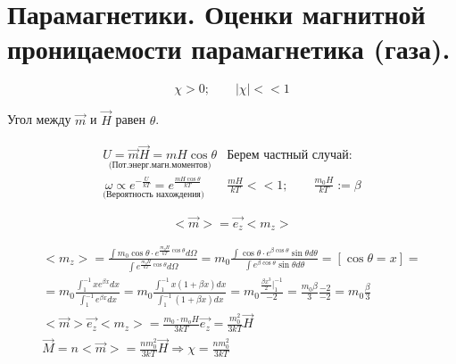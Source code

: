 \section{Парамагнетики. Оценки магнитной проницаемости парамагнетика (газа).}

\[
\chi>0; \qquad |\chi|<<1
\]

Угол между \( \vec{m} \) и \( \vec{H} \) равен \( \theta \).

\[
\begin{array}{l|l}
    \underset{\text{(Пот.энерг.магн.моментов)}}{U=\vec{m}\vec{H}=mH\cos\theta} & \text{Берем частный случай:} \\
    \underset{\text{(Вероятность нахождения)}}{\omega \propto e^{-\frac{U}{kT}}=e^{\frac{mH\cos\theta}{kT}} } & \frac{mH}{kT}<<1 ; \qquad \frac{m_0H}{kT}:=\beta  
\end{array}
\]

\[
<\vec{m}>=\vec{e_z}<m_z>
\]


\begin{gather*}
    <m_z>=\frac{\int m_0\cos\theta\cdot e^{\frac{m_0H}{kT}\cos\theta } d\Omega }{\int e^{\frac{m_0H}{kT}\cos\theta } d\Omega}=m_0\frac{\int \cos\theta\cdot e^{\beta\cos\theta} \sin\theta d\theta }{\int e^{\beta\cos\theta}\sin\theta d\theta}=[\cos\theta=x]= \\
    =m_0 \frac{\int_{1}^{-1} xe^{\beta x}dx}{\int_{1}^{-1} e^{\beta x}dx}= m_0 \frac{\int_{1}^{-1} x(1+\beta x)dx}{\int_{1}^{-1} (1+\beta x)dx }=m_0 \frac{\frac{\beta x^3}{2}|_1^{-1} }{-2}=\frac{m_0\beta}{3}\frac{-2}{-2}=m_0 \frac{\beta}{3} \\
    <\vec{m}>\vec{e_z}<m_z>=\frac{m_0\cdot m_o H}{3kT}\vec{e_z}=\frac{m_{0}^2}{3kT}\vec{H} \\
    \vec{M}=n<\vec{m}>=\frac{nm_0^2}{3kT}\vec{H}\Rightarrow \chi= \frac{nm_0^2}{3kT}
\end{gather*}

